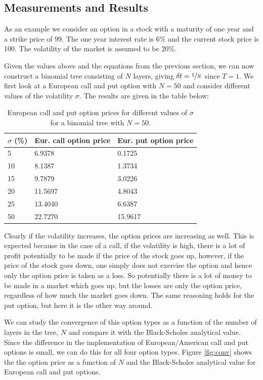 \documentclass[11pt,a4paper]{article}
\begin{document}
\subsection{Measurements and Results}

As an example we consider an option in a stock with a maturity of one year and a strike price of 99. The one year interest rate is 6\% and the current stock price is 100. The volatility of the market is assumed to be 20\%.

Given the values above and the equations from the previous section, we can now construct a binomial tree consisting of $N$ layers, giving $\delta t = \sfrac{1}{N}$ since $T = 1$. We first look at a European call and put option with $N = 50$ and consider different values of the volatility $\sigma$. The results are given in the table below:

\begin{table}[H]
  \centering
  \begin{tabular}{l | l | l}
    $\sigma$ (\%) &Eur. call option price & Eur. put option price\\
    \hline
    5 & 6.9378 & 0.1725\\
    10 & 8.1387 & 1.3734\\
    15 & 9.7879 & 3.0226\\
    20 & 11.5697 & 4.8043\\
    25 & 13.4040 & 6.6387\\
    50 & 22.7270 & 15.9617\\
  \end{tabular}
  \caption{European call and put option prices for different values of $\sigma$ for a binomial tree with $N = 50$.}
  \label{tab:eucall}
\end{table}

Clearly if the volatility increases, the option prices are increasing as well. This is expected because in the case of a call, if the volatility is high, there is a lot of profit potentially to be made if the price of the stock goes up, however, if the price of the stock goes down, one simply does not exercise the option and hence only the option price is taken as a loss. So potentially there is a lot of money to be made in a market which goes up, but the losses are only the option price, regardless of how much the market goes down. The same reasoning holds for the put option, but here it is the other way around.

We can study the convergence of this option types as a function of the number of layers in the tree, $N$ and compare it with the Black-Scholes analytical value. Since the difference in the implementation of European/American call and put options is small, we can do this for all four option types. Figure \ref{fig:conv} shows the the option price as a function of $N$ and the Black-Scholes analytical value for European call and put options. 
\end{document}
